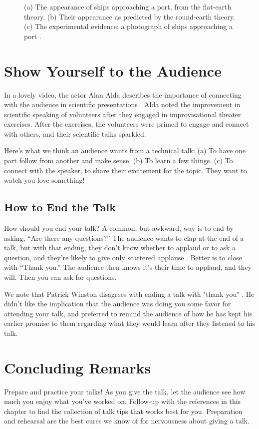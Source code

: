 \begin{figure}[htpb!]
    \centerline{
    }
    \caption{(a) The appearance of ships approaching a port, from the flat-earth theory.  (b) Their appearance as predicted by the round-earth theory.  (c) The experimental evidence:  a photograph of ships approaching a port \cite{mnsomero}. }
    \label{fig:boats}
\end{figure}



\section{Show Yourself to the Audience}

In a lovely video, the actor Alan Alda describes the importance of  connecting with the audience in scientific presentations \cite{AlanAlda}.  Alda noted the improvement in scientific speaking of volunteers after they engaged in improvisational theater exercises.  After the exercises, the volunteers were primed to engage and connect with others, and their scientific talks sparkled.

Here's what we think an audience wants from a technical talk:
(a) To have one part follow from another and make sense.
(b) To learn a few things.
(c) To connect with the speaker, to share their excitement for the topic. They want to watch you love something!


\subsection{How to End the Talk}
How should you end your talk?  A common, but awkward, way is to end by asking, ``Are there any questions?''  The audience wants to clap at the end of a talk, but with that ending, they don't know whether to applaud or to ask a question, and they're likely to give only scattered applause \cite{Adelson95}.
Better is to close with ``Thank you.''  The audience then knows it's their time to applaud, and they will.  Then you can ask for questions.

We note that Patrick Winston disagrees with ending a talk with "thank you" \cite{WinstonSpeaks}.  He didn't like the implication that the audience was doing you some favor for attending your talk, and preferred to remind the audience of how he has kept his earlier promise to them regarding what they would learn after they listened to his talk.

\section{Concluding Remarks}
Prepare and practice your talks!  As you give the talk, let the audience see how much you enjoy what you've worked on.  Follow-up with the references in this chapter to find the collection of talk tips that works best for you.  Preparation and rehearsal are the best cures we know of for nervousness about giving a talk.


